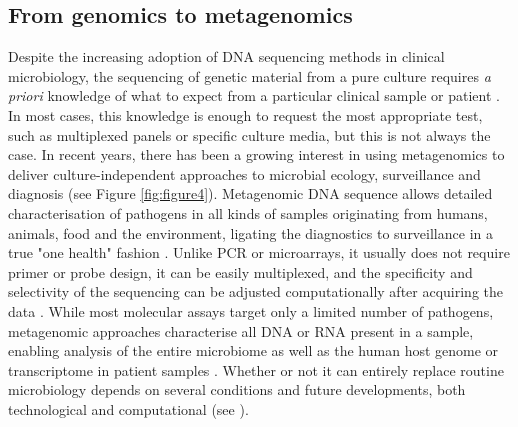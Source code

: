 \subsection{From genomics to metagenomics} \label{ssec:_intro_metagenomics}

Despite the increasing adoption of DNA sequencing methods in clinical microbiology, the sequencing of genetic material from a pure culture requires \textit{a priori} knowledge of what to expect from a particular clinical sample or patient \citep{schuele_future_2021}. 
In most cases, this knowledge is enough to request the most appropriate test, such as multiplexed panels or specific culture media, but this is not always the case. 
In recent years, there has been a growing interest in using metagenomics to deliver culture-independent approaches to microbial ecology, surveillance and diagnosis (see Figure \ref{fig:figure4})\citep{loman_twenty_2015, loman_high-throughput_2012}.
Metagenomic DNA sequence allows detailed characterisation of pathogens in all kinds of samples originating from humans, animals, food and the environment, ligating the diagnostics to surveillance in a true "one health" fashion \citep{rossen__2018}. 
Unlike PCR or microarrays, it usually does not require primer or probe design, it can be easily multiplexed, and the specificity and selectivity of the sequencing can be adjusted computationally after acquiring the data \citep{dunne_next-generation_2012}.  
While most molecular assays target only a limited number of pathogens, metagenomic approaches characterise all DNA or RNA present in a sample, enabling analysis of the entire microbiome as well as the human host genome or transcriptome in patient samples \citep{chiu_clinical_2019}. 
Whether or not it can entirely replace routine microbiology depends on several conditions and future developments, both technological and computational (see ).

